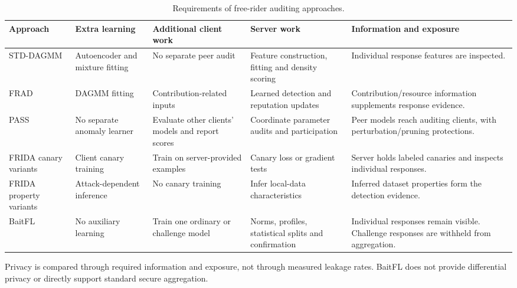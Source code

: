 \documentclass[conference]{IEEEtran}
\begin{document}
\begin{table}[t]\centering\footnotesize
\renewcommand{\arraystretch}{1.1}
\caption{Requirements of free-rider auditing approaches.}\label{tab:method-comparison}
\begin{tabular}{>{\raggedright\arraybackslash}p{2.0cm}>{\raggedright\arraybackslash}p{2.0cm}>{\raggedright\arraybackslash}p{2.7cm}>{\raggedright\arraybackslash}p{3.6cm}>{\raggedright\arraybackslash}p{5.0cm}}\toprule
Approach & Extra learning & Additional client work & Server work & Information and exposure \\ \midrule
STD-DAGMM~\cite{lin2019freeriders} & Autoencoder and mixture fitting & No separate peer audit & Feature construction, fitting and density scoring & Individual response features are inspected. \\
FRAD~\cite{wang2024frad} & DAGMM fitting & Contribution-related inputs & Learned detection and reputation updates & Contribution/resource information supplements response evidence. \\
PASS~\cite{wang2024pass} & No separate anomaly learner & Evaluate other clients' models and report scores & Coordinate parameter audits and participation & Peer models reach auditing clients, with perturbation/pruning protections. \\
FRIDA canary variants~\cite{recasens2026frida} & Client canary training & Train on server-provided examples & Canary loss or gradient tests & Server holds labeled canaries and inspects individual responses. \\
FRIDA property variants~\cite{recasens2026frida} & Attack-dependent inference & No canary training & Infer local-data characteristics & Inferred dataset properties form the detection evidence. \\
BaitFL & No auxiliary learning & Train one ordinary or challenge model & Norms, profiles, statistical splits and confirmation & Individual responses remain visible. Challenge responses are withheld from aggregation. \\
\bottomrule\end{tabular}
\par\smallskip\parbox{0.97\textwidth}{\scriptsize Privacy is compared through required information and exposure, not through measured leakage rates. BaitFL does not provide differential privacy or directly support standard secure aggregation.}
\end{table}

\end{document}
